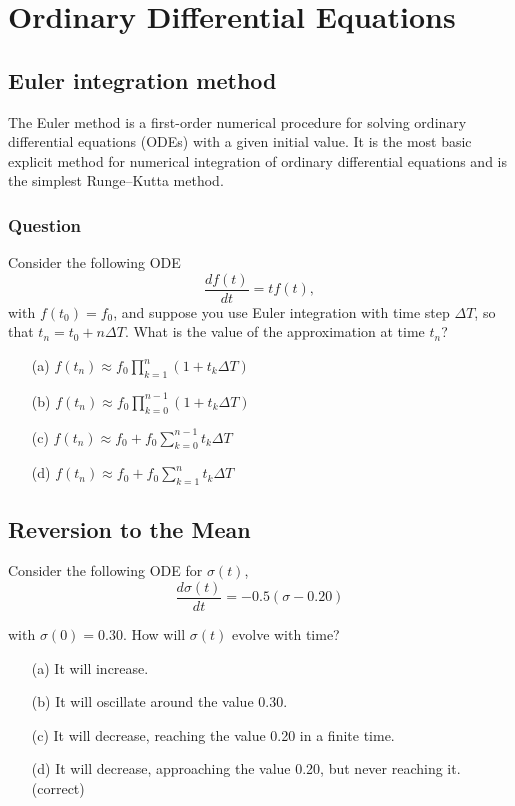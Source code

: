 \documentclass[]{article}
\begin{document}
\section{Ordinary Differential Equations}

\subsection{Euler integration method}
The Euler method is a first-order numerical procedure for solving ordinary differential equations (ODEs) with a given initial value. It is the most basic explicit method for numerical integration of ordinary differential equations and is the simplest Runge–Kutta method. 
\subsubsection*{Question}
Consider the following ODE
\[ \frac{df(t)}{dt}=tf(t),\]
with $f(t_0)=f_0$, and suppose you use Euler integration with time step $\Delta  T$, so that $t_n=t_0+n\Delta  T$. 
What is the value of the approximation at time $t_n$?

\begin{itemize}

\item[(a)] $f(t_n) \approx f_0 \prod^n_{k=1}(1+t_k\Delta  T)$

\item[(b)] $f(t_n) \approx f_0 \prod^{n−1}_{k=0}(1+t_k\Delta  T)$

\item[(c)] $f(t_n) \approx f_0+f_0\sum^{n−1}_{k=0}t_k\Delta  T$

\item[(d)] $f(t_n) \approx f_0+f_0\sum^n_{k=1}t_k \Delta  T$
\end{itemize}

\subsection{Reversion to the Mean}
Consider the following ODE for $\sigma(t)$,
\[  \frac{d\sigma(t)}{dt}= - 0.5(\sigma-0.20)\]

with $\sigma(0)=0.30$. How will $\sigma(t)$ evolve with time?

\begin{itemize}

\item[(a)] It will increase.


\item[(b)] It will oscillate around the value 0.30.


\item[(c)] It will decrease, reaching the value 0.20 in a finite time.


\item[(d)] It will decrease, approaching the value 0.20, but never reaching it.(correct)
\end{itemize}
\end{document}

